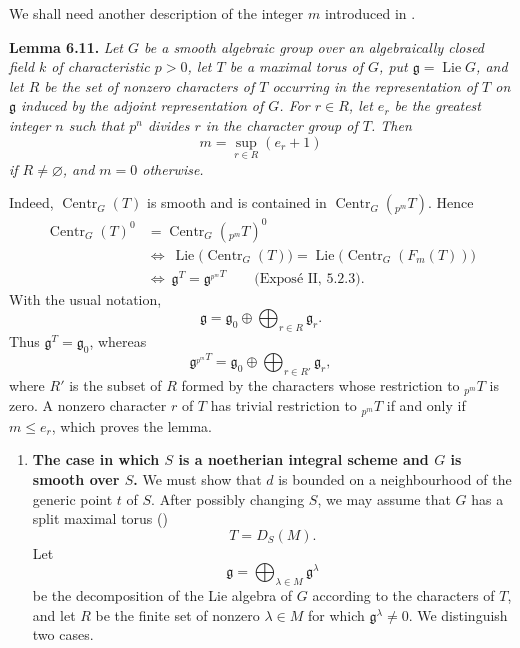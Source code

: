 We shall need another description of the integer \(m\) introduced in .

\textbf{Lemma 6.11.} \emph{Let \(G\) be a smooth algebraic group over an
algebraically closed field \(k\) of characteristic \(p>0\), let \(T\) be a
maximal torus of \(G\), put \(\mathfrak g=\operatorname{Lie}G\), and let \(R\)
be the set of nonzero characters of \(T\) occurring in the representation of
\(T\) on \(\mathfrak g\) induced by the adjoint representation of \(G\).
For \(r\in R\), let \(e_r\) be the greatest integer \(n\) such that \(p^n\)
divides \(r\) in the character group of \(T\). Then
\[
m=\sup_{r\in R}(e_r+1)
\]
if \(R\neq\varnothing\), and \(m=0\) otherwise.}

Indeed, \(\operatorname{Centr}_G(T)\) is smooth and is contained in
\(\operatorname{Centr}_G({}_{p^m}T)\). Hence
\[
\begin{aligned}
\operatorname{Centr}_G(T)^0
 &=\operatorname{Centr}_G({}_{p^m}T)^0\\
&\Longleftrightarrow\
\operatorname{Lie}\bigl(\operatorname{Centr}_G(T)\bigr)
 =\operatorname{Lie}\bigl(\operatorname{Centr}_G(F_m(T))\bigr)\\
&\Longleftrightarrow\
\mathfrak g^T=\mathfrak g^{{}_{p^m}T}
\qquad\text{(Exposé II, 5.2.3).}
\end{aligned}
\]
With the usual notation,
\[
\mathfrak g=\mathfrak g_0\oplus\bigoplus_{r\in R}\mathfrak g_r.
\]
Thus \(\mathfrak g^T=\mathfrak g_0\), whereas
\[
\mathfrak g^{{}_{p^m}T}
 =\mathfrak g_0\oplus\bigoplus_{r\in R'}\mathfrak g_r,
\]
where \(R'\) is the subset of \(R\) formed by the characters whose restriction
to \({}_{p^m}T\) is zero. A nonzero character \(r\) of \(T\) has trivial
restriction to \({}_{p^m}T\) if and only if \(m\leq e_r\), which proves the
lemma.

\begin{enumerate}
\renewcommand{\labelenumi}{\alph{enumi})}
\setcounter{enumi}{2}
\item \textbf{The case in which \(S\) is a noetherian integral scheme and \(G\) is smooth over \(S\).}
We must show that \(d\) is bounded on a neighbourhood of the generic point
\(t\) of \(S\). After possibly changing \(S\), we may assume that \(G\) has
a split maximal torus (\SGARefLink{sga3:xv:proposition:6-2}{6.2})
\[
T=D_S(M).
\]
Let
\[
\mathfrak g=\bigoplus_{\lambda\in M}\mathfrak g^\lambda
\]
be the decomposition of the Lie algebra of \(G\) according to the characters
of \(T\), and let \(R\) be the finite set of nonzero \(\lambda\in M\) for
which \(\mathfrak g^\lambda\neq0\). We distinguish two cases.
\end{enumerate}

